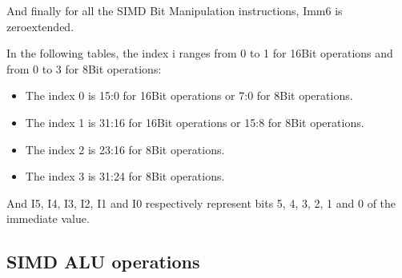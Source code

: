 \documentclass[letterpaper,10pt,english]{sphinxmanual}
\begin{document}
\sphinxAtStartPar
And finally for all the SIMD Bit Manipulation instructions, Imm6 is zero\sphinxhyphen{}extended.

\sphinxAtStartPar
In the following tables, the index i ranges from 0 to 1 for 16\sphinxhyphen{}Bit operations and from 0 to 3 for 8\sphinxhyphen{}Bit operations:
\begin{itemize}
\item {} 
\sphinxAtStartPar
The index 0 is 15:0  for 16\sphinxhyphen{}Bit operations or 7:0 for 8\sphinxhyphen{}Bit operations.

\item {} 
\sphinxAtStartPar
The index 1 is 31:16 for 16\sphinxhyphen{}Bit operations or 15:8 for 8\sphinxhyphen{}Bit operations.

\item {} 
\sphinxAtStartPar
The index 2 is 23:16 for 8\sphinxhyphen{}Bit operations.

\item {} 
\sphinxAtStartPar
The index 3 is 31:24 for 8\sphinxhyphen{}Bit operations.

\end{itemize}

\sphinxAtStartPar
And I5, I4, I3, I2, I1 and I0 respectively represent bits 5, 4, 3, 2, 1 and 0 of the immediate value.


\subsection{SIMD ALU operations}
\label{\detokenize{instruction_set_extensions:simd-alu-operations}}
\end{document}
